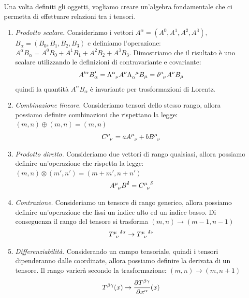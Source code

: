 Una volta definiti gli oggetti, vogliamo creare un'algebra fondamentale che ci permetta di effettuare relazioni tra i tensori.

\begin{enumerate}
\item\textit{Prodotto scalare.}
Consideriamo i vettori $A^{\alpha}=(A^0,A^1,A^2,A^3)$, $B_{\alpha}=(B_0,B_1,B_2,B_3)$ e definiamo l'operazione: $A^{\alpha}B_{\alpha}=A^0B_0+A^1B_1+A^2B_2+A^3B_3$.
Dimostriamo che il risultato è uno scalare utilizzando le definizioni di contravariante e covariante:
\begin{equation}
A'^{\alpha}B'_{\alpha}=\Lambda\indices{^\alpha_\nu}A^{\nu}\Lambda\indices{_\alpha^\mu}B_{\mu}=\delta\indices{^\mu_\nu}A^{\nu}B_{\mu}
\end{equation}
quindi la quantità $A^{\alpha}B_{\alpha}$ è invariante per trasformazioni di Lorentz.

    \item \textit{Combinazione lineare.} Consideriamo tensori dello stesso rango, allora possiamo definire combinazioni che rispettano la legge: $(m,n)\oplus(m,n)=(m,n)$
    \begin{equation}
    C\indices{^{\mu}_\nu}
       =aA\indices{^{\mu}_\nu}+
    bB\indices{^{\mu}_\nu}
\end{equation}
    \item \textit{Prodotto diretto.} Consideriamo due vettori di rango qualsiasi, allora possiamo definire un'operazione che rispetta la legge: $(m,n)\otimes(m',n')=(m+m',n+n')$
    \begin{equation}
   A\indices{^{\mu}_\nu}
    B\indices{^\delta}= C\indices{^{\mu}_\nu^\delta}
\end{equation}
    \item \textit{Contrazione.} Consideriamo un tensore di rango generico, allora possiamo definire un'operazione che fissi un indice alto ed un indice basso. Di conseguenza il rango del tensore si trasforma $(m,n)\rightarrow(m-1,n-1)$
   \begin{equation}
    T\indices{^\mu_\nu ^{\delta\sigma}}
    \rightarrow
    T\indices{^\mu_\nu ^{\delta\nu}}
\end{equation}
    \item \textit{Differenziabilità.} Considerando un campo tensoriale, quindi i tensori dipenderanno dalle coordinate, allora possiamo definire la derivata di un tensore. Il rango varierà secondo la trasformazione: $(m,n)\rightarrow(m,n+1)$
   \begin{equation}
    T\indices{^{\beta\gamma}}(x)
    \rightarrow
    \dfrac{\partial T\indices{^{\beta\gamma}}}{\partial x^\alpha}(x)
\end{equation}

\end{enumerate}

